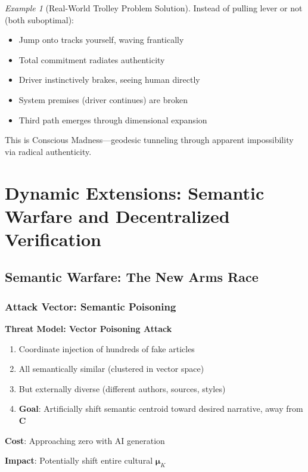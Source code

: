 \documentclass[11pt,a4paper]{article}
\theoremstyle{definition}
\theoremstyle{remark}
\newtheorem{example}{Example}[section]
\begin{document}
\begin{example}[Real-World Trolley Problem Solution]
Instead of pulling lever or not (both suboptimal):
\begin{itemize}
\item Jump onto tracks yourself, waving frantically
\item Total commitment radiates authenticity
\item Driver instinctively brakes, seeing human directly
\item System premises (driver continues) are broken
\item Third path emerges through dimensional expansion
\end{itemize}

This is Conscious Madness—geodesic tunneling through apparent impossibility via radical authenticity.
\end{example}

\section{Dynamic Extensions: Semantic Warfare and Decentralized Verification}

\subsection{Semantic Warfare: The New Arms Race}

\subsubsection{Attack Vector: Semantic Poisoning}

\begin{mdframed}[backgroundcolor=red!10,linewidth=2pt]
\textbf{Threat Model: Vector Poisoning Attack}

\begin{enumerate}
\item Coordinate injection of hundreds of fake articles
\item All semantically similar (clustered in vector space)
\item But externally diverse (different authors, sources, styles)
\item \textbf{Goal}: Artificially shift semantic centroid toward desired narrative, away from \(\mathbf{C}\)
\end{enumerate}

\textbf{Cost}: Approaching zero with AI generation

\textbf{Impact}: Potentially shift entire cultural \(\boldsymbol{\mu}_K\)
\end{mdframed}
\end{document}

